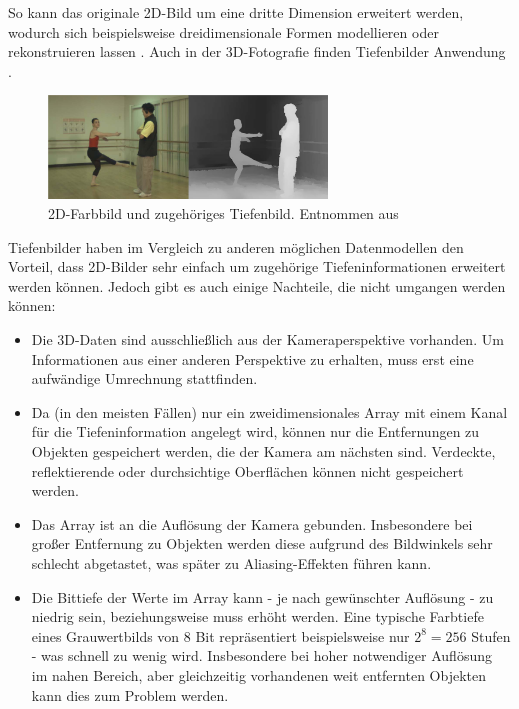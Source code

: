 So kann das originale 2D-Bild um eine dritte Dimension erweitert werden, wodurch sich beispielsweise dreidimensionale Formen modellieren oder rekonstruieren lassen \cite{arsalan2017synthesizing}.
Auch in der 3D-Fotografie finden Tiefenbilder Anwendung \cite{redert2006philips}.

\begin{figure}[H]
	\centering
	\includegraphics[width=0.66\textwidth]{images/depth_map.png}
	\caption{2D-Farbbild und zugehöriges Tiefenbild. Entnommen aus \cite[649]{muller2010depth}}
	\label{fig:depth_map}
\end{figure}

Tiefenbilder haben im Vergleich zu anderen möglichen Datenmodellen den Vorteil, dass 2D-Bilder sehr einfach um zugehörige Tiefeninformationen erweitert werden können.
Jedoch gibt es auch einige Nachteile, die nicht umgangen werden können:

\begin{itemize}
\item Die 3D-Daten sind ausschließlich aus der Kameraperspektive vorhanden.
Um Informationen aus einer anderen Perspektive zu erhalten, muss erst eine aufwändige Umrechnung stattfinden.
\item Da (in den meisten Fällen) nur ein zweidimensionales Array mit einem Kanal für die Tiefeninformation angelegt wird, können nur die Entfernungen zu Objekten gespeichert werden, die der Kamera am nächsten sind.
Verdeckte, reflektierende oder durchsichtige Oberflächen können nicht gespeichert werden.
\item Das Array ist an die Auflösung der Kamera gebunden.
Insbesondere bei großer Entfernung zu Objekten werden diese aufgrund des Bildwinkels sehr schlecht abgetastet, was später zu Aliasing-Effekten führen kann.
\item Die Bittiefe der Werte im Array kann - je nach gewünschter Auflösung - zu niedrig sein, beziehungsweise muss erhöht werden.
Eine typische Farbtiefe eines Grauwertbilds von 8 Bit repräsentiert beispielsweise nur $2^8 = 256$ Stufen - was schnell zu wenig wird.
Insbesondere bei hoher notwendiger Auflösung im nahen Bereich, aber gleichzeitig vorhandenen weit entfernten Objekten kann dies zum Problem werden.
\end{itemize}


